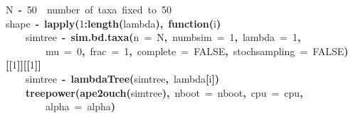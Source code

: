\documentclass{elsarticle}
\makeatletter
\newcommand{\hlnumber}[1]{\textcolor[rgb]{0,0,0}{#1}}%
\newcommand{\hlfunctioncall}[1]{\textcolor[rgb]{.5,0,.33}{\textbf{#1}}}%
\newcommand{\hlkeyword}[1]{\textbf{#1}}%
\newcommand{\hlargument}[1]{\textcolor[rgb]{.69,.25,.02}{#1}}%
\newcommand{\hlcomment}[1]{\textcolor[rgb]{.18,.6,.34}{#1}}%
\newcommand{\hlformalargs}[1]{\hlargument{#1}}%
\newcommand{\hlassignement}[1]{\textbf{#1}}%
\newcommand{\hlsymbol}[1]{#1}%
\newcommand{\hlstd}[1]{\textcolor[rgb]{0,0,0}{#1}}%
\newenvironment{kframe}{%
 \def\FrameCommand##1{\hskip\@totalleftmargin \hskip-\fboxsep
 \colorbox{shadecolor}{##1}\hskip-\fboxsep
     \hskip-\linewidth \hskip-\@totalleftmargin \hskip\columnwidth}%
 \MakeFramed {\advance\hsize-\width
   \@totalleftmargin\z@ \linewidth\hsize
   \@setminipage}}%
 {\par\unskip\endMakeFramed}
\newenvironment{knitrout}{}{} %
\makeatother
\begin{document}
\begin{knitrout}
{\begin{kframe}
\begin{flushleft}
\hlstd{}\hlsymbol{N}{\ }\hlassignement{\usebox{\hlnormalsizeboxlessthan}-}{\ }\hlnumber{50}{\ }{\ }\hlcomment{\usebox{\hlnormalsizeboxhash}\usebox{\hlnormalsizeboxhash}{\ }number{\ }of{\ }taxa{\ }fixed{\ }to{\ }50}\hspace*{\fill}\\
\hlstd{}\hlsymbol{shape}{\ }\hlassignement{\usebox{\hlnormalsizeboxlessthan}-}{\ }\hlfunctioncall{lapply}\hlkeyword{(}\hlnumber{1}\hlkeyword{:}\hlfunctioncall{length}\hlkeyword{(}\hlsymbol{lambda}\hlkeyword{)}\hlkeyword{,}{\ }\hlkeyword{function}\hlkeyword{(}\hlformalargs{i}\hlkeyword{)}{\ }\hlkeyword{\usebox{\hlnormalsizeboxopenbrace}}\hspace*{\fill}\\
\hlstd{}{\ }{\ }{\ }{\ }\hlsymbol{simtree}{\ }\hlassignement{\usebox{\hlnormalsizeboxlessthan}-}{\ }\hlfunctioncall{sim.bd.taxa}\hlkeyword{(}\hlargument{n}{\ }\hlargument{=}{\ }\hlsymbol{N}\hlkeyword{,}{\ }\hlargument{numbsim}{\ }\hlargument{=}{\ }\hlnumber{1}\hlkeyword{,}{\ }\hlargument{lambda}{\ }\hlargument{=}{\ }\hlnumber{1}\hlkeyword{,}\hspace*{\fill}\\
\hlstd{}{\ }{\ }{\ }{\ }{\ }{\ }{\ }{\ }\hlargument{mu}{\ }\hlargument{=}{\ }\hlnumber{0}\hlkeyword{,}{\ }\hlargument{frac}{\ }\hlargument{=}{\ }\hlnumber{1}\hlkeyword{,}{\ }\hlargument{complete}{\ }\hlargument{=}{\ }\hlnumber{FALSE}\hlkeyword{,}{\ }\hlargument{stochsampling}{\ }\hlargument{=}{\ }\hlnumber{FALSE}\hlkeyword{)}\hlkeyword{[[}\hlnumber{1}\hlkeyword{]}\hlkeyword{]}\hlkeyword{[[}\hlnumber{1}\hlkeyword{]}\hlkeyword{]}\hspace*{\fill}\\
\hlstd{}{\ }{\ }{\ }{\ }\hlsymbol{simtree}{\ }\hlassignement{\usebox{\hlnormalsizeboxlessthan}-}{\ }\hlfunctioncall{lambdaTree}\hlkeyword{(}\hlsymbol{simtree}\hlkeyword{,}{\ }\hlsymbol{lambda}\hlkeyword{[}\hlsymbol{i}\hlkeyword{]}\hlkeyword{)}\hspace*{\fill}\\
\hlstd{}{\ }{\ }{\ }{\ }\hlfunctioncall{treepower}\hlkeyword{(}\hlfunctioncall{ape2ouch}\hlkeyword{(}\hlsymbol{simtree}\hlkeyword{)}\hlkeyword{,}{\ }\hlargument{nboot}{\ }\hlargument{=}{\ }\hlsymbol{nboot}\hlkeyword{,}{\ }\hlargument{cpu}{\ }\hlargument{=}{\ }\hlsymbol{cpu}\hlkeyword{,}\hspace*{\fill}\\
\hlstd{}{\ }{\ }{\ }{\ }{\ }{\ }{\ }{\ }\hlargument{alpha}{\ }\hlargument{=}{\ }\hlsymbol{alpha}\hlkeyword{)}\hspace*{\fill}\\

\end{flushleft}
\end{kframe}}
\end{knitrout}
\end{document}
